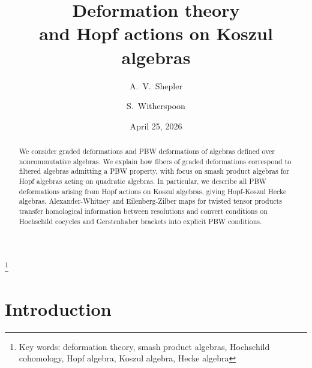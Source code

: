 \documentclass[11pt]{amsart}
\numberwithin{equation}{section}
\renewcommand{\_}[1]{\mbox{$_{\left( #1 \right)}$}}
\begin{document}
 
 \nocite{*} %

 \begin{abstract}
   We consider graded deformations and PBW deformations
 of algebras defined over noncommutative algebras.
We explain how fibers of graded 
deformations correspond to
filtered algebras admitting a PBW property, with focus on 
smash product algebras for Hopf algebras 
acting on quadratic algebras.
In particular, we describe all PBW deformations
arising from Hopf actions 
on Koszul algebras, giving Hopf-Koszul Hecke algebras.
Alexander-Whitney and Eilenberg-Zilber maps for twisted
tensor products 
transfer homological information between resolutions 
and convert conditions on Hochschild cocycles and Gerstenhaber brackets
into explicit PBW conditions. 
\end{abstract}
   
%  
\title[Deformation theory and Hopf actions on Koszul algebras]
        {Deformation theory\\ and Hopf actions on Koszul algebras}

        \date{April 25, 2026} 
  

\thanks{Key words: %
deformation theory, smash product algebras,
  Hochschild cohomology, Hopf algebra, Koszul algebra, Hecke algebra} 

\author{A.\ V.\ Shepler}
\address{Department of Mathematics, University of North Texas,
Denton, TX 76201, USA}
\author{S.\  Witherspoon}
\address{Department of Mathematics\\Texas A\&M University\\
College Station, TX 77843, USA} 

\maketitle
\setcounter{tocdepth}{1}%
\tableofcontents 

\section{Introduction}\label{Intro}
\end{document}
